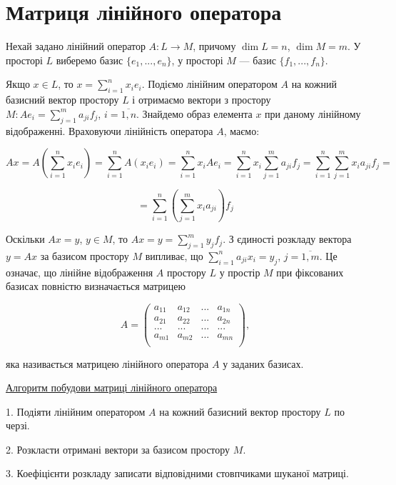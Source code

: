 \section{Матриця лінійного оператора}

Нехай задано лінійний оператор $A: L \rightarrow M$, причому $\dim L = n$, $\dim M = m$.
У просторі $L$ виберемо базис $\{e_1, ..., e_n\}$, у просторі $M$ --- базис $\{f_1, ..., f_n\}$.

Якщо $x \in L$, то $x = \sum\limits_{i=1}^n x_i e_i$. Подіємо лінійним оператором $A$ на кожний
базисний вектор простору $L$ і отримаємо вектори з простору $M: A e_i = \sum\limits_{j=1}^m a_{ji} f_j$,
$i = \overline{1,n}$. Знайдемо образ елемента $x$ при даному лінійному відображенні.
Враховуючи лінійність оператора $A$, маємо:

$$A x = A\left( \sum\limits_{i=1}^n x_i e_i \right)
= \sum\limits_{i=1}^n A(x_i e_i) = \sum\limits_{i=1}^n x_i A e_i
= \sum\limits_{i=1}^n x_i \sum\limits_{j=1}^m a_{ji} f_j
= \sum\limits_{i=1}^n\sum\limits_{j=1}^m x_i a_{ji} f_j = $$

$$ = \sum\limits_{i=1}^n \left( \sum\limits_{j=1}^m x_i a_{ji} \right) f_j$$

Оскільки $Ax = y$, $y \in M$, то $A x = y = \sum\limits_{j=1}^m y_j f_j$. З єдиності розкладу вектора
$y = A x$ за базисом простору $M$ випливає, що $\sum\limits_{i=1}^n a_{ji} x_i = y_j$, $j = \overline{1,m}$.
Це означає, що лінійне відображення $A$ простору $L$ у простір $M$ при фіксованих базисах
повністю визначається матрицею

$$A = \begin{pmatrix}
	a_{11} & a_{12} & ... & a_{1n} \\
	a_{21} & a_{22} & ... & a_{2n} \\
	...    & ...    & ... & ...    \\
	a_{m1} & a_{m2} & ... & a_{mn} \\
\end{pmatrix},$$

яка називається матрицею лінійного оператора $A$ у заданих базисах.

\underline{Алгоритм побудови матриці лінійного оператора}

1. Подіяти лінійним оператором $A$ на кожний базисний вектор простору $L$ по
черзі.

2. Розкласти отримані вектори за базисом простору $M$.

3. Коефіцієнти розкладу записати відповідними стовпчиками шуканої матриці.


